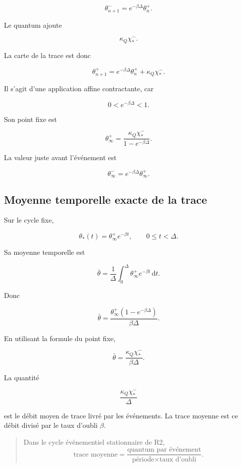 \[
\theta_{n+1}^-
=
e^{-\beta\Delta}\theta_n^+.
\]

Le quantum ajoute

\[
\kappa_Q\chi_\ast^-.
\]

La carte de la trace est donc

\[
\boxed{
\theta_{n+1}^+
=
e^{-\beta\Delta}\theta_n^+
+
\kappa_Q\chi_\ast^-.
}
\]

Il s'agit d'une application affine contractante, car

\[
0<e^{-\beta\Delta}<1.
\]

Son point fixe est

\[
\boxed{
\theta_\infty^+
=
\frac{
\kappa_Q\chi_\ast^-
}{
1-e^{-\beta\Delta}
}.
}
\]

La valeur juste avant l'événement est

\[
\boxed{
\theta_\infty^-
=
e^{-\beta\Delta}
\theta_\infty^+.
}
\]

\subsection{Moyenne temporelle exacte de la trace}
\label{annexe-r2-moyenne-trace}

Sur le cycle fixe,

\[
\theta_\ast(t)
=
\theta_\infty^+
e^{-\beta t},
\qquad
0\leq t<\Delta.
\]

Sa moyenne temporelle est

\[
\bar\theta
=
\frac{1}{\Delta}
\int_0^\Delta
\theta_\infty^+
e^{-\beta t}
\,\mathrm dt.
\]

Donc

\[
\bar\theta
=
\frac{
\theta_\infty^+
\left(
1-e^{-\beta\Delta}
\right)
}{
\beta\Delta
}.
\]

En utilisant la formule du point fixe,

\[
\boxed{
\bar\theta
=
\frac{
\kappa_Q\chi_\ast^-
}{
\beta\Delta
}.
}
\]

La quantité

\[
\frac{\kappa_Q\chi_\ast^-}{\Delta}
\]

est le débit moyen de trace livré par les événements. La trace moyenne
est ce débit divisé par le taux d'oubli \(\beta\).

\begin{quote}
Dans le cycle événementiel stationnaire de R2,
\[
\text{trace moyenne}
=
\frac{
\text{quantum par événement}
}{
\text{période}\times\text{taux d'oubli}
}.
\]
\end{quote}

